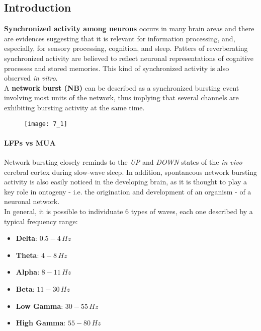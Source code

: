 \subsection{Introduction}
\textbf{Synchronized activity among neurons} occurs in many brain areas and there
are evidences suggesting that it is relevant for information processing, and,
especially, for sensory processing, cognition, and sleep. Patters of reverberating
synchronized activity are believed to reflect neuronal representations of cognitive
processes and stored memories. This kind of synchronized activity is also observed
\textit{in vitro}.\\
A \textbf{network burst (NB)} can be described as a synchronized bursting event
involving most units of the network, thus implying that several channels are
exhibiting bursting activity at the same time.
\begin{figure}[H]
    \texttt{[image: 7\_1]}
    \centering
\end{figure}
\paragraph{LFPs vs MUA}
Network bursting closely reminds to the \textit{UP} and \textit{DOWN} states
of the \textit{in vivo} cerebral cortex during slow-wave sleep.
In addition, spontaneous network bursting activity is also easily
noticed in the developing brain, as it is thought to play a key role in ontogeny
- i.e. the origination and development of an organism - of a neuronal network.\\
In general, it is possible to individuate 6 types of waves, each one described by a
typical frequency range:
\begin{itemize}
    \item \textbf{Delta}: \(0.5-4\,Hz\)
    \item \textbf{Theta}: \(4-8\,Hz\)
    \item \textbf{Alpha}: \(8-11\,Hz\)
    \item \textbf{Beta}: \(11-30\,Hz\)
    \item \textbf{Low Gamma}: \(30-55\,Hz\)
    \item \textbf{High Gamma}: \(55-80\,Hz\)
\end{itemize}

